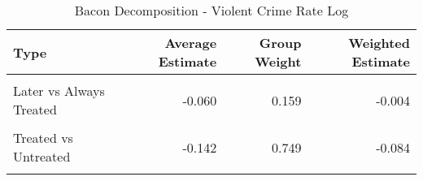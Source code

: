 \begin{table}[H]

\caption{\label{tab:tab:bacondecompositionViolent}Bacon Decomposition - Violent Crime Rate Log}
\centering
\begin{tabular}[t]{lrrr}
\toprule
Type & Average Estimate & Group Weight & Weighted Estimate\\
\midrule
\cellcolor{gray!6}{Earlier vs Later Treated} & \cellcolor{gray!6}{0.100} & \cellcolor{gray!6}{0.068} & \cellcolor{gray!6}{0.005}\\
Later vs Always Treated & -0.060 & 0.159 & -0.004\\
\cellcolor{gray!6}{Later vs Earlier Treated} & \cellcolor{gray!6}{0.021} & \cellcolor{gray!6}{0.023} & \cellcolor{gray!6}{-0.002}\\
Treated vs Untreated & -0.142 & 0.749 & -0.084\\
\cellcolor{gray!6}{Total TWFE} & \cellcolor{gray!6}{NaN} & \cellcolor{gray!6}{NaN} & \cellcolor{gray!6}{-0.085}\\
\bottomrule
\end{tabular}
\end{table}
